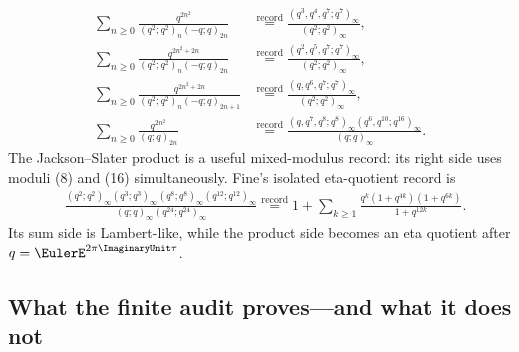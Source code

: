 \begin{align}
 \sum_{n\ge0}\frac{q^{2n^2}}
 {(q^2;q^2)_n(-q;q)_{2n}}
 &\mathrel{\stackrel{\mathrm{record}}{=}}
 \frac{(q^3,q^4,q^7;q^7)_\infty}{(q^2;q^2)_\infty},
 \tag{SR-RS.1}\label{qg:eq-record-rs-1}\\
 \sum_{n\ge0}\frac{q^{2n^2+2n}}
 {(q^2;q^2)_n(-q;q)_{2n}}
 &\mathrel{\stackrel{\mathrm{record}}{=}}
 \frac{(q^2,q^5,q^7;q^7)_\infty}{(q^2;q^2)_\infty},
 \tag{SR-RS.2}\label{qg:eq-record-rs-2}\\
 \sum_{n\ge0}\frac{q^{2n^2+2n}}
 {(q^2;q^2)_n(-q;q)_{2n+1}}
 &\mathrel{\stackrel{\mathrm{record}}{=}}
 \frac{(q,q^6,q^7;q^7)_\infty}{(q^2;q^2)_\infty},
 \tag{SR-RS.3}\label{qg:eq-record-rs-3}\\
 \sum_{n\ge0}\frac{q^{2n^2}}{(q;q)_{2n}}
 &\mathrel{\stackrel{\mathrm{record}}{=}}
 \frac{(q,q^7,q^8;q^8)_\infty
       (q^6,q^{10};q^{16})_\infty}
 {(q;q)_\infty}.
 \tag{SR-JS}\label{qg:eq-record-js}
\end{align}
The Jackson--Slater product is a useful mixed-modulus record: its right side
uses moduli (8) and (16) simultaneously.  Fine's isolated eta-quotient
record is
\begin{align}
 &\frac{(q^2;q^2)_\infty(q^3;q^3)_\infty
        (q^8;q^8)_\infty(q^{12};q^{12})_\infty}
       {(q;q)_\infty(q^{24};q^{24})_\infty}
 \mathrel{\stackrel{\mathrm{record}}{=}}
 1+\sum_{k\ge1}
 \frac{q^k(1+q^{4k})(1+q^{6k})}{1+q^{12k}}.
 \tag{SR-F}\label{qg:eq-record-fine}
\end{align}
Its sum side is Lambert-like, while the product side becomes an eta quotient
after \(q=\EulerE^{2\pi\ImaginaryUnit\tau}\).

\subsection{What the finite audit proves---and what it does not}

